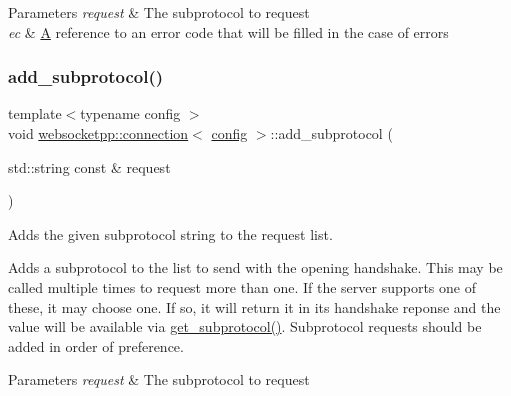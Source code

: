 \begin{DoxyParams}{Parameters}
{\em request} & The subprotocol to request \\
\hline
{\em ec} & \mbox{\hyperlink{struct_a}{A}} reference to an error code that will be filled in the case of errors \\
\hline
\end{DoxyParams}
\mbox{\label{classwebsocketpp_1_1connection_a37a41672dd87714eb045fd989f98cd26}} 
\subsubsection{\texorpdfstring{add\+\_\+subprotocol()}{add\_subprotocol()}\hspace{0.1cm}{\footnotesize\ttfamily [2/2]}}
{\footnotesize\ttfamily template$<$typename config $>$ \\
void \mbox{\hyperlink{classwebsocketpp_1_1connection}{websocketpp\+::connection}}$<$ \mbox{\hyperlink{classconfig}{config}} $>$\+::add\+\_\+subprotocol (\begin{DoxyParamCaption}\item[{std\+::string const \&}]{request }\end{DoxyParamCaption})}



Adds the given subprotocol string to the request list. 

Adds a subprotocol to the list to send with the opening handshake. This may be called multiple times to request more than one. If the server supports one of these, it may choose one. If so, it will return it in it\textquotesingle{}s handshake reponse and the value will be available via \mbox{\hyperlink{classwebsocketpp_1_1connection_ae8577184f6e4d82955cc38e1a9f8164b}{get\+\_\+subprotocol()}}. Subprotocol requests should be added in order of preference.


\begin{DoxyParams}{Parameters}
{\em request} & The subprotocol to request \\
\hline
\end{DoxyParams}
\mbox{\label{classwebsocketpp_1_1connection_af8cb78acc61b8a3d59f6162cdba6318b}} 
